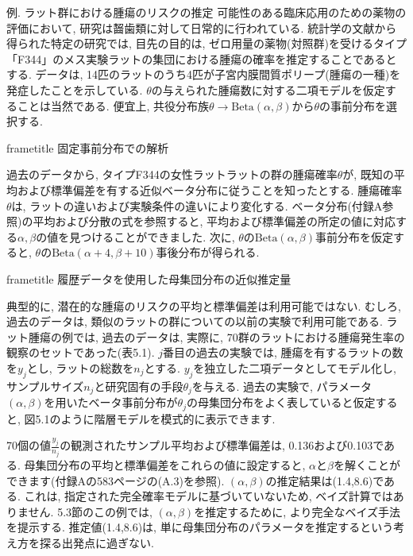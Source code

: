 \documentclass[10pt,dvipdfmx,a4]{beamer}
\newcommand{\dbox}[1]{\begin{beamercolorbox}[wd=122mm, sep=0pt, shadow=false, rounded=false]{frametitle} { #1}\end{beamercolorbox}}
\begin{document}

\begin{frame}{例. ラット群における腫瘍のリスクの推定}
可能性のある臨床応用のための薬物の評価において, 研究は齧歯類に対して日常的に行われている.
統計学の文献から得られた特定の研究では, 目先の目的は, ゼロ用量の薬物(対照群)を受けるタイプ「F344」のメス実験ラットの集団における腫瘍の確率を推定することであるとする.
データは, 14匹のラットのうち4匹が子宮内膜間質ポリープ(腫瘍の一種)を発症したことを示している.
$\theta$の与えられた腫瘍数に対する二項モデルを仮定することは当然である.
便宜上, 共役分布族$\theta\rightarrow\text{Beta}(\alpha,\beta)$から$\theta$の事前分布を選択する.

\dbox{固定事前分布での解析}
過去のデータから, タイプF344の女性ラットラットの群の腫瘍確率$\theta$が, 既知の平均および標準偏差を有する近似ベータ分布に従うことを知ったとする.
腫瘍確率$\theta$は, ラットの違いおよび実験条件の違いにより変化する.
ベータ分布(付録A参照)の平均および分散の式を参照すると, 平均および標準偏差の所定の値に対応する$\alpha, \beta$の値を見つけることができました.
次に, $\theta$の$\text{Beta}(\alpha,\beta)$事前分布を仮定すると, $\theta$の$\text{Beta}(\alpha+4,\beta+10)$事後分布が得られる.
\end{frame}


\begin{frame}
\dbox{履歴データを使用した母集団分布の近似推定量}
典型的に, 潜在的な腫瘍のリスクの平均と標準偏差は利用可能ではない.
むしろ, 過去のデータは, 類似のラットの群についての以前の実験で利用可能である.
ラット腫瘍の例では, 過去のデータは, 実際に, 70群のラットにおける腫瘍発生率の観察のセットであった(表5.1).
$j$番目の過去の実験では, 腫瘍を有するラットの数を$y_j$とし, ラットの総数を$n_j$とする.
$y_j$を独立した二項データとしてモデル化し, サンプルサイズ$n_j$と研究固有の手段$\theta_j$を与える.
過去の実験で, パラメータ$(\alpha,\beta)$を用いたベータ事前分布が$\theta_j$の母集団分布をよく表していると仮定すると, 図5.1のように階層モデルを模式的に表示できます.

70個の値$\tfrac{y_j}{n_j}$の観測されたサンプル平均および標準偏差は, 0.136および0.103である.
母集団分布の平均と標準偏差をこれらの値に設定すると, $\alpha$と$\beta$を解くことができます(付録Aの583ページの(A.3)を参照).
$(\alpha, \beta)$の推定結果は(1.4,8.6)である.
これは, 指定された完全確率モデルに基づいていないため, ベイズ計算ではありません.
5.3節のこの例では, $(\alpha,\beta)$を推定するために, より完全なベイズ手法を提示する.
推定値(1.4,8.6)は, 単に母集団分布のパラメータを推定するという考え方を探る出発点に過ぎない.
\end{frame}
\end{document}
